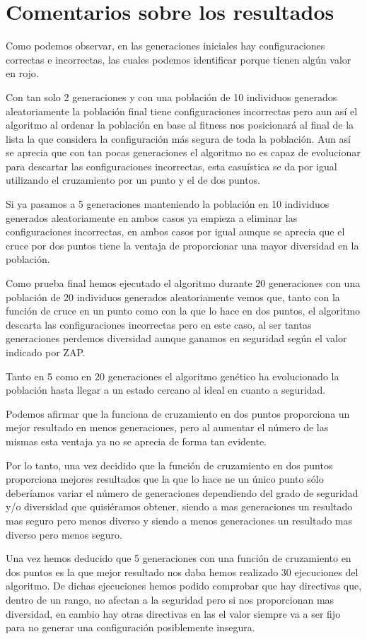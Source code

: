 \section{Comentarios sobre los resultados}

Como podemos observar, en las generaciones iniciales hay configuraciones correctas e incorrectas, las cuales podemos identificar porque tienen algún valor en rojo. 

\bigskip
Con tan solo 2 generaciones y con una población de 10 individuos generados aleatoriamente la población final tiene configuraciones incorrectas pero aun así el algoritmo al ordenar la población en base al fitness nos posicionará al final de la lista la que considera la configuración más segura de toda la población. Aun así se aprecia que con tan pocas generaciones el algoritmo no es capaz de evolucionar para descartar las configuraciones incorrectas, esta casuística se da por igual utilizando el cruzamiento por un punto y el de dos puntos.

\bigskip
Si ya pasamos a 5 generaciones manteniendo la población en 10 individuos generados aleatoriamente en ambos casos ya empieza a eliminar las configuraciones incorrectas, en ambos casos por igual aunque se aprecia que el cruce por dos puntos tiene la ventaja de proporcionar una mayor diversidad en la población.

\bigskip
Como prueba final hemos ejecutado el algoritmo durante 20 generaciones con una población de 20 individuos generados aleatoriamente vemos que, tanto con la función de cruce en un punto como con la que lo hace en dos puntos, el algoritmo descarta las configuraciones incorrectas pero en este caso, al ser tantas generaciones perdemos diversidad aunque ganamos en seguridad según el valor indicado por ZAP.

\bigskip
Tanto en 5 como en 20 generaciones el algoritmo genético ha evolucionado la población hasta llegar a un estado cercano al ideal en cuanto a seguridad.

\bigskip
Podemos afirmar que la funciona de cruzamiento en dos puntos proporciona un mejor resultado en menos generaciones, pero al aumentar el número de las mismas esta ventaja ya no se aprecia de forma tan evidente.

\bigskip
Por lo tanto, una vez decidido que la función de cruzamiento en dos puntos proporciona mejores resultados que la que lo hace ne un único punto sólo deberíamos variar el número de generaciones dependiendo del grado de seguridad y/o diversidad que quisiéramos obtener, siendo a mas generaciones un resultado mas seguro pero menos diverso y siendo a menos generaciones un resultado mas diverso pero menos seguro.

\bigskip
Una vez hemos deducido que 5 generaciones con una función de cruzamiento en dos puntos es la que mejor resultado nos daba hemos realizado 30 ejecuciones del algoritmo. De dichas ejecuciones hemos podido comprobar que hay directivas que, dentro de un rango, no afectan a la seguridad pero si nos proporcionan mas diversidad, en cambio hay otras directivas en las el valor siempre va a ser fijo para no generar una configuración posiblemente insegura.

